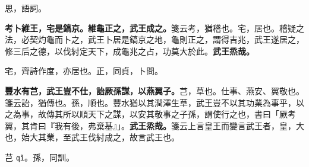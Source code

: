 \begin{quoting}思，語詞。\end{quoting}

\textbf{考卜維王，宅是鎬京。維龜正之，武王成之。}{\footnotesize 箋云考，猶稽也。宅，居也。稽疑之法，必契灼龜而卜之，武王卜居是鎬京之地，龜則正之，謂得吉兆，武王遂居之，修三后之德，以伐紂定天下，成龜兆之占，功莫大於此。}\textbf{武王烝哉。}

\begin{quoting}宅，齊詩作度，亦居也。正，同貞，卜問。\end{quoting}

\textbf{豐水有芑，武王豈不仕，詒厥孫謀，以燕翼子。}{\footnotesize 芑，草也。仕事、燕安、翼敬也。箋云詒，猶傳也。孫，順也。豐水猶以其潤澤生草，武王豈不以其功業為事乎，以之為事，故傳其所以順天下之謀，以安其敬事之子孫，謂使行之也，書曰「厥考翼，其肯曰『我有後，弗棄基』」。}\textbf{武王烝哉。}{\footnotesize 箋云上言皇王而變言武王者，皇，大也，始大其業，至武王伐紂成之，故言武王也。}

\begin{quoting}芑 \texttt{qǐ}。孫，同訓。\end{quoting}

